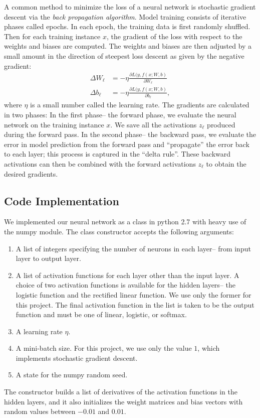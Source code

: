 \documentclass[12pt]{article}
\begin{document}
A common method to minimize the loss of a neural network is stochastic gradient descent via the \emph{back propagation algorithm}. Model training consists of iterative phases called epochs. In each epoch, the training data is first randomly shuffled. Then for each training instance $x$, the gradient of the loss with respect to the weights and biases are computed. The weights and biases are then adjusted by a small amount in the direction of steepest loss descent as given by the negative gradient:
\begin{align*}
\Delta W_{\ell} &= -\eta \frac{\partial L(y, f(x; W,b)}{\partial W_{\ell}} \\
\Delta b_{\ell} &= -\eta \frac{\partial L(y, f(x; W,b)}{\partial b_{\ell}},
\end{align*}
where $\eta$ is a small number called the learning rate. The gradients are calculated in two phases: In the first phase-- the forward phase, we evaluate the neural network on the training instance $x$. We save all the activations $z_{\ell}$ produced during the forward pass. In the second phase-- the backward pass, we evaluate the error in model prediction from the forward pass and ``propagate'' the error back to each layer; this process is captured in the ``delta rule''. These backward activations can then be combined with the forward activations $z_{\ell}$ to obtain the desired gradients.


\subsection{Code Implementation}

We implemented our neural network as a class in python 2.7 with heavy use of the numpy module. The class constructor accepts the following arguments:
\begin{enumerate}
\item A list of integers specifying the number of neurons in each layer-- from input layer to output layer.
\item A list of activation functions for each layer other than the input layer. A choice of two activation functions is available for the hidden layers-- the logistic function and the rectified linear function. We use only the former for this project. The final activation function in the list is taken to be the output function and must be one of linear, logistic, or softmax.
\item A learning rate $\eta$.
\item A mini-batch size. For this project, we use only the value $1$, which implements stochastic gradient descent.
\item A state for the numpy random seed.
\end{enumerate}
The constructor builds a list of derivatives of the activation functions in the hidden layers, and it also initializes the weight matrices and bias vectors with random values between $-0.01$ and $0.01$.
\end{document}
